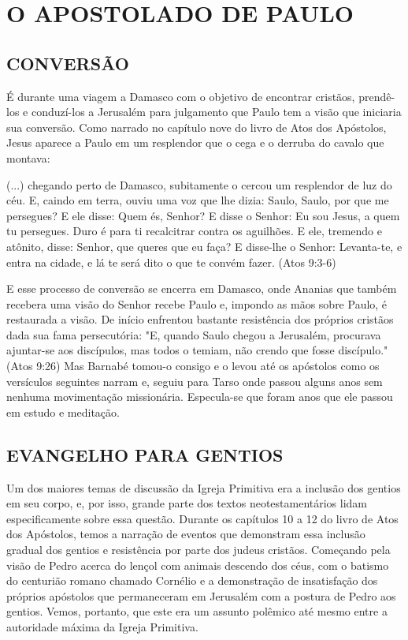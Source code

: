 \documentclass[
    article,            %
	12pt,				%
	oneside,			%
	a4paper,			%
	chapter=TITLE,		%
	section=TITLE,		%
	english,			%
	french,				%
	spanish,			%
	brazil				%
	]{abntex2}
\begin{document}
\section{O APOSTOLADO DE PAULO}
\subsection{CONVERSÃO}
É durante uma viagem a Damasco com o objetivo de encontrar cristãos, prendê-los e conduzí-los a Jerusalém para julgamento que Paulo tem a visão que iniciaria sua conversão. Como narrado no capítulo nove do livro de Atos dos Apóstolos, Jesus aparece a Paulo em um resplendor que o cega e o derruba do cavalo que montava: 
\begin{citacao}
(...) chegando perto de Damasco, subitamente o cercou um resplendor de luz do céu. E, caindo em terra, ouviu uma voz que lhe dizia: Saulo, Saulo, por que me persegues? E ele disse: Quem és, Senhor? E disse o Senhor: Eu sou Jesus, a quem tu persegues. Duro é para ti recalcitrar contra os aguilhões. E ele, tremendo e atônito, disse: Senhor, que queres que eu faça? E disse-lhe o Senhor: Levanta-te, e entra na cidade, e lá te será dito o que te convém fazer. (Atos 9:3-6)
\end{citacao}
E esse processo de conversão se encerra em Damasco, onde Ananias que também recebera uma visão do Senhor recebe Paulo e, impondo as mãos sobre Paulo, é restaurada a visão. De início enfrentou bastante resistência dos próprios cristãos dada sua fama persecutória: "E, quando Saulo chegou a Jerusalém, procurava ajuntar-se aos discípulos, mas todos o temiam, não crendo que fosse discípulo." (Atos 9:26) Mas Barnabé tomou-o consigo e o levou até os apóstolos como os versículos seguintes narram e, seguiu para Tarso onde passou alguns anos sem nenhuma movimentação missionária. Especula-se que foram anos que ele passou em estudo e meditação.
\subsection{EVANGELHO PARA GENTIOS}
Um dos maiores temas de discussão da Igreja Primitiva era a inclusão dos gentios em seu corpo, e, por isso, grande parte dos textos neotestamentários lidam especificamente sobre essa questão. Durante os capítulos 10 a 12 do livro de Atos dos Apóstolos, temos a narração de eventos que demonstram essa inclusão gradual dos gentios e resistência por parte dos judeus cristãos. Começando pela visão de Pedro acerca do lençol com animais descendo dos céus, com o batismo do centurião romano chamado Cornélio e a demonstração de insatisfação dos próprios apóstolos que permaneceram em Jerusalém com a postura de Pedro aos gentios. Vemos, portanto, que este era um assunto polêmico até mesmo entre a autoridade máxima da Igreja Primitiva.
\end{document}

